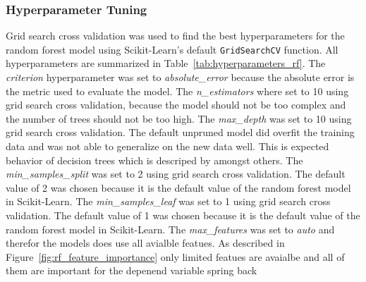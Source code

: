\subsubsection*{Hyperparameter Tuning}
Grid search cross validation was used to find the best hyperparameters for the random forest model using Scikit-Learn's default \texttt{GridSearchCV} function.
All hyperparameters are summarized in Table~\ref{tab:hyperparameters_rf}.
The \textit{criterion} hyperparameter was set to \textit{absolute\_error} because the absolute error is the metric used to evaluate the model.
The \textit{n\_estimators} where set to 10 using grid search cross validation, because the model should not be too complex and the number of trees should not be too high.
The \textit{max\_depth} was set to 10 using grid search cross validation. The default unpruned model did overfit the training data and was not able to generalize on the new data well. This is expected behavior of decision trees which is descriped by \cite[p. 133-136]{muller_introductionmachinelearning_2016} amongst others.
The \textit{min\_samples\_split} was set to 2 using grid search cross validation. The default value of 2 was chosen because it is the default value of the random forest model in Scikit-Learn.
The \textit{min\_samples\_leaf} was set to 1 using grid search cross validation. The default value of 1 was chosen because it is the default value of the random forest model in Scikit-Learn.
The \textit{max\_features} was set to \textit{auto} and therefor the models does use all avialble featues. As described in Figure~\ref{fig:rf_feature_importance} only limited featues are avaialbe and all of them are important for the depenend variable spring back


